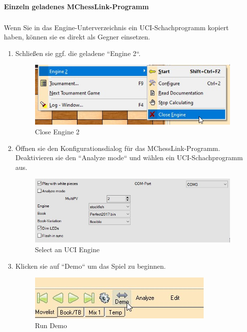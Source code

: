 \documentclass[11pt,a4paper]{article}
\begin{document}
\paragraph{Einzeln geladenes MChessLink-Programm}
\subparagraph{} Wenn Sie in das Engine-Unterverzeichnis ein UCI-Schachprogramm kopiert haben, können sie es direkt als Gegner einsetzen.
\begin{enumerate}
	\item Schließen sie ggf. die geladene ``Engine 2``.
	\begin{figure}[H]
		\centering
		\includegraphics[scale=0.7]{arena_closeengine2.jpg}
		\caption{Close Engine 2}
		\label{fig:ArenaCloseEngine2}
	\end{figure}
    \item Öffnen sie den Konfigurationsdialog für das MChessLink-Programm. Deaktivieren sie den ``Analyze mode`` und wählen ein UCI-Schachprogramm aus.
    	\begin{figure}[H]
    	\centering
    	\includegraphics[scale=0.7]{arena_ConfigureMChessLink2.jpg}
    	\caption{Select an UCI Engine}
    	\label{fig:ArenaConfigureCertabo2}
    \end{figure}
    \item Klicken sie auf ``Demo`` um das Spiel zu beginnen.
    \begin{figure}[H]
    	\centering
    	\includegraphics[scale=0.7]{arena_demo.jpg}
    	\caption{Run Demo}
    	\label{fig:ArenaDemo}
    \end{figure}
\end{enumerate}
\end{document}
